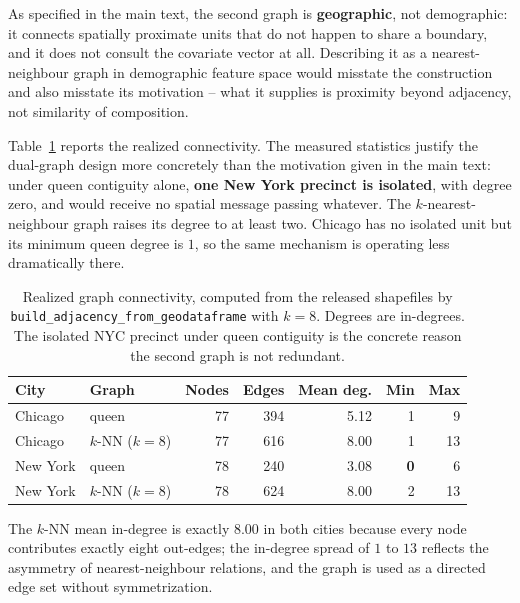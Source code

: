 \documentclass[journal,10pt,onecolumn]{IEEEtran}
\begin{document}
As specified in the main text, the second graph is \textbf{geographic}, not demographic:
it connects spatially proximate units that do not happen to share a boundary, and it does
not consult the covariate vector at all. Describing it as a nearest-neighbour graph in
demographic feature space would misstate the construction and also misstate its motivation --
what it supplies is proximity beyond adjacency, not similarity of composition.

Table~\ref{tab:s-graphs} reports the realized connectivity. The measured
statistics justify the dual-graph design more concretely than the motivation given
in the main text: under queen contiguity alone, \textbf{one New York precinct is
isolated}, with degree zero, and would receive no spatial message passing
whatever. The $k$-nearest-neighbour graph raises its degree to at least two.
Chicago has no isolated unit but its minimum queen degree is $1$, so the same
mechanism is operating less dramatically there.

\begin{table}[!t]
  \centering
  \caption{Realized graph connectivity, computed from the released shapefiles by
  \texttt{build\_adjacency\_from\_geodataframe} with $k = 8$. Degrees are
  in-degrees. The isolated NYC precinct under queen contiguity is the concrete
  reason the second graph is not redundant.}
  \label{tab:s-graphs}
  \begin{tabular}{l l r r r r r}
    \toprule
    \textbf{City} & \textbf{Graph} & \textbf{Nodes} & \textbf{Edges}
    & \textbf{Mean deg.} & \textbf{Min} & \textbf{Max} \\
    \midrule
    Chicago & queen & 77 & 394 & 5.12 & 1 & 9 \\
    Chicago & $k$-NN ($k{=}8$) & 77 & 616 & 8.00 & 1 & 13 \\
    \addlinespace
    New York & queen & 78 & 240 & 3.08 & \textbf{0} & 6 \\
    New York & $k$-NN ($k{=}8$) & 78 & 624 & 8.00 & 2 & 13 \\
    \bottomrule
  \end{tabular}
\end{table}

The $k$-NN mean in-degree is exactly $8.00$ in both cities because every node
contributes exactly eight out-edges; the in-degree spread of $1$ to $13$ reflects
the asymmetry of nearest-neighbour relations, and the graph is used as a directed
edge set without symmetrization.
\end{document}

